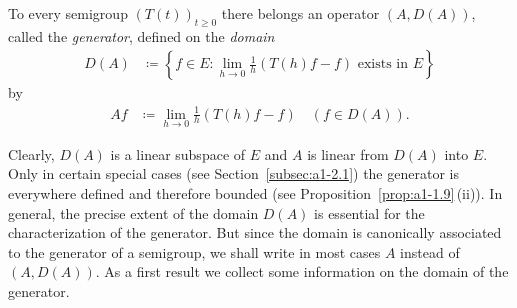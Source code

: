 \begin{definition}\label{def:a1-1.5}
To every semigroup $(T(t))_{t \geq 0}$ there belongs an operator $(A,D(A))$, 
called the \emph{generator}, defined on the \emph{domain}
\begin{align*}
    D(A) &\coloneqq \left\{ f \in E \colon \lim_{h\to0} \frac{1}{h}(T(h)f - f)
             \text{ exists in } E \right\}
\end{align*}
by
\begin{align*}
    Af &\coloneqq \lim_{h\to0} \frac{1}{h}(T(h)f - f) \quad (f \in D(A)).
\end{align*}
\end{definition}
Clearly, $D(A)$ is a linear subspace of\/ $E$ and $A$ is linear from $D(A)$ into $E$.
Only in certain special cases (see Section~\ref{subsec:a1-2.1}) the generator
is everywhere defined and therefore bounded (see Proposition~\ref{prop:a1-1.9}\,(ii)). 
In general, the precise extent of the domain $D(A)$ is essential for the characterization of the generator.
But since the domain is canonically associated to the generator of a semigroup, we shall write in most cases $A$ instead of\/ $(A,D(A))$.
As a first result we collect some information on the domain of the generator.
